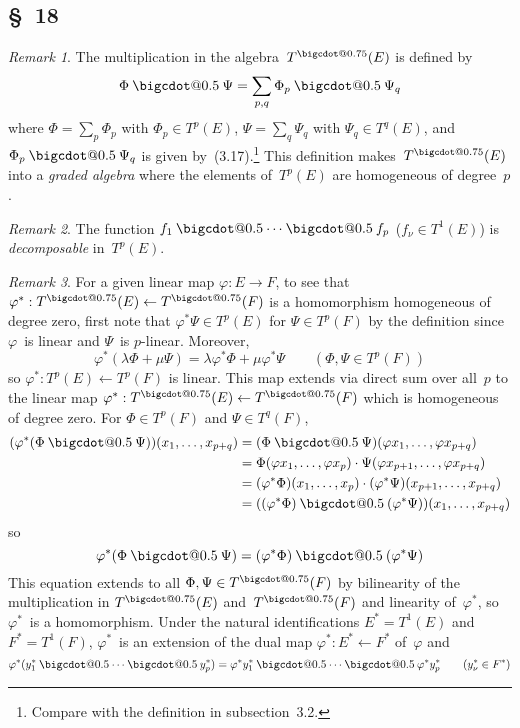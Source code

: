 \documentclass[letterpaper,12pt]{article}
\makeatletter
\newcommand{\from}{\leftarrow}
\newcommand{\bigcdot}[1]{\mathbin{\mathpalette\bigcdot@{#1}}}
\newcommand{\bigcdot@}[2]{%
  \sbox0{$#1\vcenter{}$}%
  \sbox2{$#1\cdot\m@th$}%
  \hbox{%
    \hfil
    \raise\ht0\hbox{%
      \scalebox{#2}{%
        \lower\ht0\hbox{$#1\bullet\m@th$}%
      }%
    }%
    \hfil
  }%
}
\newcommand{\mult}{\cdot}
\newcommand{\fprod}{\bigcdot{0.5}}
\newcommand{\tdot}{\bigcdot{0.75}}
\newcommand{\multi}[4]{#2_{#3}#1\cdots#1#2_{#4}}
\newcommand{\fprods}[3]{\multi{\fprod}{#1}{#2}{#3}}
\theoremstyle{definition}
\theoremstyle{remark}
\newtheorem*{rmk}{Remark}
\makeatother
\begin{document}
\subsection*{\S~18}
\begin{rmk}
The multiplication in the algebra~\(T^{\tdot}(E)\) is defined by
\[\Phi\fprod\Psi=\sum_{p,q}\Phi_p\fprod\Psi_q\]
where \(\Phi=\sum_p\Phi_p\) with \(\Phi_p\in T^p(E)\), \(\Psi=\sum_q\Psi_q\) with \(\Psi_q\in T^q(E)\), and \(\Phi_p\fprod\Psi_q\) is given by~(3.17).\footnote{Compare with the definition in subsection~3.2.} This definition makes~\(T^{\tdot}(E)\) into a \emph{graded algebra} where the elements of~\(T^p(E)\) are homogeneous of degree~\(p\).
\end{rmk}

\begin{rmk}
The function \(\fprods{f}{1}{p}\) (\(f_{\nu}\in T^1(E)\)) is \emph{decomposable} in~\(T^p(E)\).
\end{rmk}

\begin{rmk}
For a given linear map \(\varphi:E\to F\), to see that \(\varphi^*:T^{\tdot}(E)\from T^{\tdot}(F)\) is a homomorphism homogeneous of degree zero, first note that \(\varphi^*\Psi\in T^p(E)\) for \(\Psi\in T^p(F)\) by the definition since \(\varphi\)~is linear and \(\Psi\)~is \(p\)-linear. Moreover,
\[\varphi^*(\lambda\Phi+\mu\Psi)=\lambda\varphi^*\Phi+\mu\varphi^*\Psi\qquad(\Phi,\Psi\in T^p(F))\]
so \(\varphi^*:T^p(E)\from T^p(F)\) is linear. This map extends via direct sum over all~\(p\) to the linear map \(\varphi^*:T^{\tdot}(E)\from T^{\tdot}(F)\) which is homogeneous of degree zero. For \(\Phi\in T^p(F)\) and \(\Psi\in T^q(F)\),
\begin{align*}
(\varphi^*(\Phi\fprod\Psi))(x_1,\ldots,x_{p+q})&=(\Phi\fprod\Psi)(\varphi x_1,\ldots,\varphi x_{p+q})\\
	&=\Phi(\varphi x_1,\ldots,\varphi x_p)\mult\Psi(\varphi x_{p+1},\ldots,\varphi x_{p+q})\\
	&=(\varphi^*\Phi)(x_1,\ldots,x_p)\mult(\varphi^*\Psi)(x_{p+1},\ldots,x_{p+q})\\
	&=((\varphi^*\Phi)\fprod(\varphi^*\Psi))(x_1,\ldots,x_{p+q})
\end{align*}
so
\[\varphi^*(\Phi\fprod\Psi)=(\varphi^*\Phi)\fprod(\varphi^*\Psi)\]
This equation extends to all \(\Phi,\Psi\in T^{\tdot}(F)\) by bilinearity of the multiplication in \(T^{\tdot}(E)\) and~\(T^{\tdot}(F)\) and linearity of~\(\varphi^*\), so \(\varphi^*\)~is a homomorphism. Under the natural identifications \(E^*=T^1(E)\) and \(F^*=T^1(F)\), \(\varphi^*\)~is an extension of the dual map \(\varphi^*:E^*\from F^*\) of~\(\varphi\) and
\[\varphi^*(\fprods{y^*}{1}{p})=\fprods{\varphi^*y^*}{1}{p}\qquad(y^*_{\nu}\in F^*)\]
\end{rmk}
\end{document}
